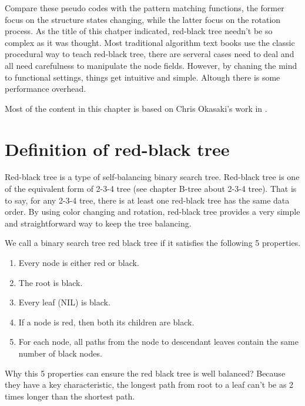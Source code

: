 \documentclass{article}
\begin{document}
Compare these pseudo codes with the pattern matching functions, 
the former focus on the structure states changing, while the 
latter focus on the rotation process. As the title of this 
chatper indicated, red-black tree needn't be so complex as it 
was thought. Most traditional algorithm text books use the 
classic procedural way to teach red-black tree, there are 
serveral cases need to deal and all need carefulness to 
manipulate the node fields. However, by chaning
the mind to functional settings, things get intuitive and
simple. Altough there is some performance overhead.

Most of the content in this chapter is based on Chris Okasaki's
work in \cite{okasaki}.

\section{Definition of red-black tree}

Red-black tree is a type of self-balancing binary search tree\cite{wiki}. 
Red-black tree is one of the equivalent form of 2-3-4 tree (see chapter
B-tree about 2-3-4 tree). That is to say, for any 2-3-4 tree, there is at least 
one red-black tree has the same data order. By using color changing and rotation, 
red-black tree provides a very simple and straightforward way to keep 
the tree balancing.

We call a binary search tree red black tree if it satisfies the following 5 
properties\cite{CLRS}.

\begin{enumerate}
\item Every node is either red or black.
\item The root is black.
\item Every leaf (NIL) is black.
\item If a node is red, then both its children are black.
\item For each node, all paths from the node to descendant leaves contain the same number of black nodes.
\end{enumerate}

Why this 5 properties can ensure the red black tree is well balanced? Because they have a key characteristic, the longest path from root to a leaf can't be as 2 times longer than the shortest path.
\end{document}
